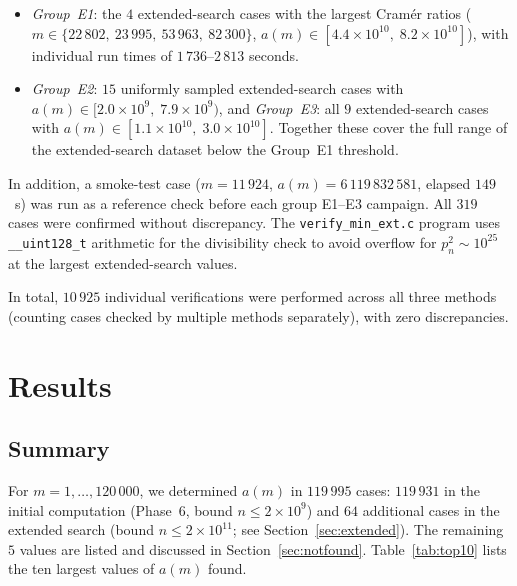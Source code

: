 \documentclass{amsart}
\theoremstyle{definition}
\theoremstyle{remark}
\numberwithin{equation}{section}
\begin{document}
\begin{enumerate}
\begin{itemize}
		$a(m) > 10^9$ from the initial computation, including
		$m = 14\,740$
		($a(m) = 1{,}994{,}463{,}433$) and $m = 16\,167$
		($a(m) = 1{,}881{,}095{,}843$), the two largest values in
		that dataset.
		\item \emph{Group~E1}: the $4$ extended-search cases with the
		largest Cram\'er ratios
		($m \in \{22\,802,\ 23\,995,\ 53\,963,\ 82\,300\}$,
		$a(m) \in [4.4 \times 10^{10},\; 8.2 \times 10^{10}]$),
		with individual run times of $1\,736$--$2\,813$ seconds.
		\item \emph{Group~E2}: $15$ uniformly sampled extended-search
		cases with $a(m) \in [2.0 \times 10^9,\; 7.9 \times 10^9)$,
		and \emph{Group~E3}: all $9$ extended-search cases with
		$a(m) \in [1.1 \times 10^{10},\; 3.0 \times 10^{10}]$.
		Together these cover the full range of the extended-search
		dataset below the Group~E1 threshold.
	\end{itemize}
	In addition, a smoke-test case ($m = 11\,924$,
	$a(m) = 6\,119\,832\,581$, elapsed $149$~s) was run as a
	reference check before each group E1--E3 campaign.
	All $319$ cases were confirmed without discrepancy.
	The \texttt{verify\_min\_ext.c} program uses \texttt{\_\_uint128\_t}
	arithmetic for the divisibility check to avoid overflow for
	$p_n^2 \sim 10^{25}$ at the largest extended-search values.
\end{enumerate}

In total, $10\,925$ individual verifications were performed across all
three methods (counting cases checked by multiple methods separately),
with zero discrepancies.

\section{Results}

\subsection{Summary}

For $m = 1, \ldots, 120\,000$, we determined $a(m)$ in $119\,995$ cases:
$119\,931$ in the initial computation (Phase~6, bound
$n \leq 2 \times 10^9$) and $64$ additional cases in the extended
search (bound $n \leq 2 \times 10^{11}$; see
Section~\ref{sec:extended}).
The remaining $5$ values are listed and discussed in
Section~\ref{sec:notfound}.
Table~\ref{tab:top10} lists the ten largest values of $a(m)$ found.
\end{document}
